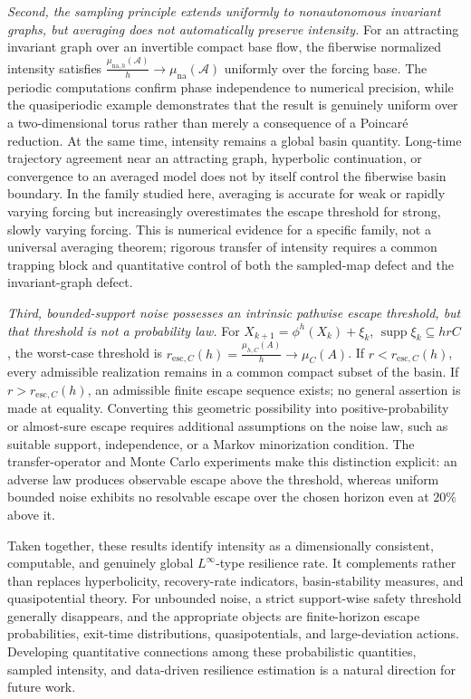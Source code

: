 \documentclass[pdflatex,sn-mathphys-num]{sn-jnl}
\numberwithin{equation}{section}
\theoremstyle{thmstyleone}%
\theoremstyle{definition}
\theoremstyle{remark}
\begin{document}
\emph{Second, the sampling principle extends uniformly to nonautonomous invariant graphs, but averaging does not automatically preserve intensity.}
For an attracting invariant graph over an invertible compact base flow, the fiberwise normalized intensity satisfies
$\frac{\mu_{\mathrm{na},h}(\mathcal A)}{h}
    \to
    \mu_{\mathrm{na}}(\mathcal A)$
uniformly over the forcing base. The periodic computations confirm phase independence to numerical precision, while the quasiperiodic example demonstrates that the result is genuinely uniform over a two-dimensional torus rather than merely a consequence of a Poincar\'e reduction. At the same time, intensity remains a global basin quantity. Long-time trajectory agreement near an attracting graph, hyperbolic continuation, or convergence to an averaged model does not by itself control the fiberwise basin boundary. In the family studied here, averaging is accurate for weak or rapidly varying forcing but increasingly overestimates the escape threshold for strong, slowly varying forcing. This is numerical evidence for a specific family, not a universal averaging theorem; rigorous transfer of intensity requires a common trapping block and quantitative control of both the sampled-map defect and the invariant-graph defect.

\emph{Third, bounded-support noise possesses an intrinsic pathwise escape threshold, but that threshold is not a probability law.}
For
$X_{k+1}=\phi^h(X_k)+\xi_k$, $\operatorname{supp}\xi_k\subseteq hrC$,
the worst-case threshold is
$r_{\mathrm{esc},C}(h)
    =
    \frac{\mu_{h,C}(A)}{h}
    \to
    \mu_C(A)$.
If \(r<r_{\mathrm{esc},C}(h)\), every admissible realization remains in a common compact subset of the basin. If \(r>r_{\mathrm{esc},C}(h)\), an admissible finite escape sequence exists; no general assertion is made at equality. Converting this geometric possibility into positive-probability or almost-sure escape requires additional assumptions on the noise law, such as suitable support, independence, or a Markov minorization condition. The transfer-operator and Monte Carlo experiments make this distinction explicit: an adverse law produces observable escape above the threshold, whereas uniform bounded noise exhibits no resolvable escape over the chosen horizon even at \(20\%\) above it.

Taken together, these results identify intensity as a dimensionally consistent, computable, and genuinely global \(L^\infty\)-type resilience rate. It complements rather than replaces hyperbolicity, recovery-rate indicators, basin-stability measures, and quasipotential theory. For unbounded noise, a strict support-wise safety threshold generally disappears, and the appropriate objects are finite-horizon escape probabilities, exit-time distributions, quasipotentials, and large-deviation actions. Developing quantitative connections among these probabilistic quantities, sampled intensity, and data-driven resilience estimation is a natural direction for future work.



\end{document}
